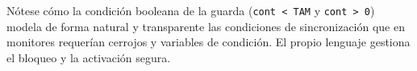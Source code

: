 \begin{aviso}
Nótese cómo la condición booleana de la guarda (\texttt{cont < TAM} y \texttt{cont > 0}) modela de forma natural y transparente las condiciones de sincronización que en monitores requerían cerrojos y variables de condición. El propio lenguaje gestiona el bloqueo y la activación segura.
\end{aviso}
